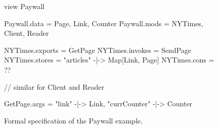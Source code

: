 \def\view{\textbf{view}\xspace}
\def\data{\textit{data}\xspace}

\def\paywall{\textsf{Paywall}}

\begin{figure}[ht]
\centering
  \begin{slangmath}
    view Paywall

    Paywall.data = {Page, Link, Counter}
    Paywall.mods = {NYTimes, Client, Reader}

    NYTimes.exports = {GetPage}
    NYTimes.invokes = {SendPage}
    NYTimes.stores  = {"articles" -|-> Map[Link, Page]}
    NYTimes.cons    = {??}

    // similar for Client and Reader

    GetPage.args = {"link" -|-> Link, "currCounter" -|-> Counter}
  \end{slangmath}

\caption{Formal specification of the Paywall example.\label{fig-paywall-formal}}
\end{figure}
